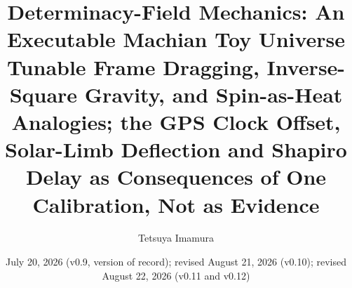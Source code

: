 \documentclass[aps,reprint,amsmath,amssymb,nofootinbib,superscriptaddress,floatfix]{revtex4-2}
\begin{document}
\title{\texorpdfstring{Determinacy-Field Mechanics: An Executable
Machian Toy Universe\\
{\normalsize Tunable Frame Dragging, Inverse-Square Gravity, and
Spin-as-Heat Analogies; the GPS Clock Offset, Solar-Limb Deflection
and Shapiro Delay as Consequences of One Calibration, Not as
Evidence}}%
{Determinacy-Field Mechanics: An Executable Machian Toy Universe. Tunable Frame Dragging, Inverse-Square Gravity, and Spin-as-Heat Analogies; the GPS Clock Offset, Solar-Limb Deflection and Shapiro Delay as Consequences of One Calibration, Not as Evidence}}

\author{Tetsuya Imamura}

\date{July 20, 2026 (v0.9, version of record); revised August 21, 2026
  (v0.10); revised August 22, 2026 (v0.11 and v0.12)}
\end{document}
